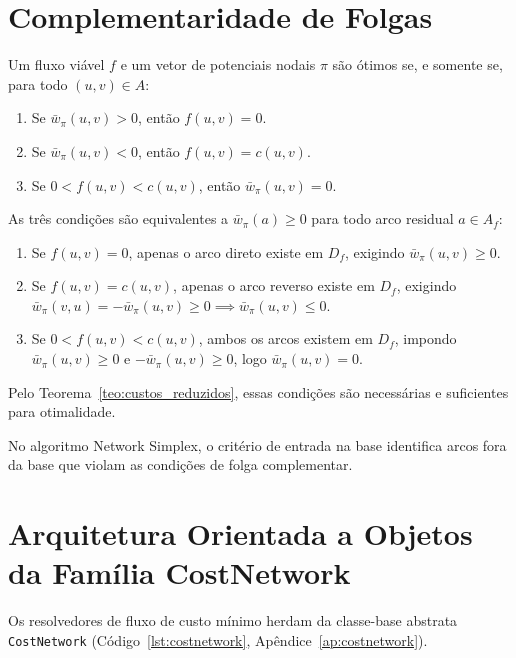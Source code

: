 \section{Complementaridade de Folgas}

\begin{teorema}
Um fluxo viável $f$ e um vetor de potenciais nodais $\pi$ são ótimos se, e somente se, para todo $(u,v) \in A$:
\begin{enumerate}
    \item Se $\bar{w}_\pi(u,v) > 0$, então $f(u,v) = 0$.
    \item Se $\bar{w}_\pi(u,v) < 0$, então $f(u,v) = c(u,v)$.
    \item Se $0 < f(u,v) < c(u,v)$, então $\bar{w}_\pi(u,v) = 0$.
\end{enumerate}
\end{teorema}

\begin{demonstracao}
As três condições são equivalentes a $\bar{w}_\pi(a) \ge 0$ para todo arco residual $a \in A_f$:
\begin{enumerate}
    \item Se $f(u,v) = 0$, apenas o arco direto existe em $D_f$, exigindo $\bar{w}_\pi(u,v) \ge 0$.
    \item Se $f(u,v) = c(u,v)$, apenas o arco reverso existe em $D_f$, exigindo $\bar{w}_\pi(v,u) = -\bar{w}_\pi(u,v) \ge 0 \implies \bar{w}_\pi(u,v) \le 0$.
    \item Se $0 < f(u,v) < c(u,v)$, ambos os arcos existem em $D_f$, impondo $\bar{w}_\pi(u,v) \ge 0$ e $-\bar{w}_\pi(u,v) \ge 0$, logo $\bar{w}_\pi(u,v) = 0$.
\end{enumerate}
Pelo Teorema~\ref{teo:custos_reduzidos}, essas condições são necessárias e suficientes para otimalidade.
\end{demonstracao}

No algoritmo Network Simplex, o critério de entrada na base identifica arcos fora da base que violam as condições de folga complementar.


\section{Arquitetura Orientada a Objetos da Família CostNetwork}

Os resolvedores de fluxo de custo mínimo herdam da classe-base abstrata \lstinline{CostNetwork} (Código~\ref{lst:costnetwork}, Apêndice~\ref{ap:costnetwork}).

